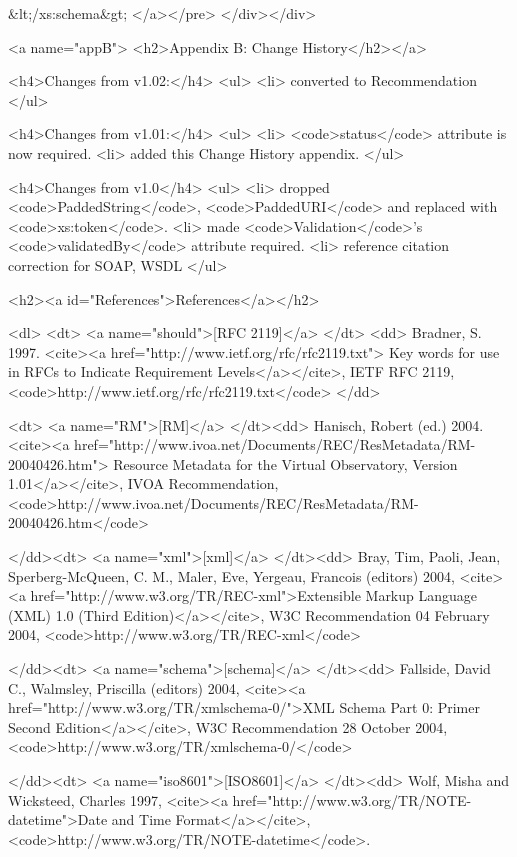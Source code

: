 \documentclass[11pt,a4paper]{ivoa}
\begin{document}
&lt;/xs:schema&gt;
</a></pre>
</div></div>

<a name="appB">
<h2>Appendix B: Change History</h2></a>

<h4>Changes from v1.02:</h4>
<ul>
  <li> converted to Recommendation
</ul>

<h4>Changes from v1.01:</h4>
<ul>
  <li> <code>status</code> attribute is now required.
  <li> added this Change History appendix.
</ul>

<h4>Changes from v1.0</h4>
<ul>
  <li> dropped <code>PaddedString</code>, <code>PaddedURI</code> and replaced
       with <code>xs:token</code>.
  <li> made <code>Validation</code>'s <code>validatedBy</code> attribute
       required.
  <li> reference citation correction for SOAP, WSDL
</ul>



<h2><a id="References">References</a></h2>

<dl>
  <dt> <a name="should">[RFC 2119]</a> </dt>
  <dd> Bradner, S. 1997. <cite><a href="http://www.ietf.org/rfc/rfc2119.txt">
       Key words for use in RFCs to Indicate Requirement
       Levels</a></cite>, IETF RFC 2119,
       <code>http://www.ietf.org/rfc/rfc2119.txt</code> </dd>

  <dt> <a name="RM">[RM]</a>
  </dt><dd> Hanisch, Robert (ed.) 2004.
       <cite><a href="http://www.ivoa.net/Documents/REC/ResMetadata/RM-20040426.htm">
       Resource Metadata for the Virtual Observatory, Version 1.01</a></cite>,
       IVOA Recommendation,
     <code>http://www.ivoa.net/Documents/REC/ResMetadata/RM-20040426.htm</code>

  </dd><dt> <a name="xml">[xml]</a>
  </dt><dd> Bray, Tim, Paoli, Jean, Sperberg-McQueen, C. M., Maler, Eve,
       Yergeau, Francois (editors) 2004,
       <cite><a href="http://www.w3.org/TR/REC-xml">Extensible Markup
       Language (XML) 1.0 (Third Edition)</a></cite>, W3C
       Recommendation 04 February 2004,
       <code>http://www.w3.org/TR/REC-xml</code>

  </dd><dt> <a name="schema">[schema]</a>
  </dt><dd> Fallside, David C., Walmsley, Priscilla (editors) 2004,
       <cite><a href="http://www.w3.org/TR/xmlschema-0/">XML Schema
       Part 0: Primer Second Edition</a></cite>, W3C Recommendation 28
       October 2004, <code>http://www.w3.org/TR/xmlschema-0/</code>

  </dd><dt> <a name="iso8601">[ISO8601]</a>
  </dt><dd> Wolf, Misha and Wicksteed, Charles 1997,
       <cite><a href="http://www.w3.org/TR/NOTE-datetime">Date and
       Time Format</a></cite>, <code>http://www.w3.org/TR/NOTE-datetime</code>.
\end{document}
